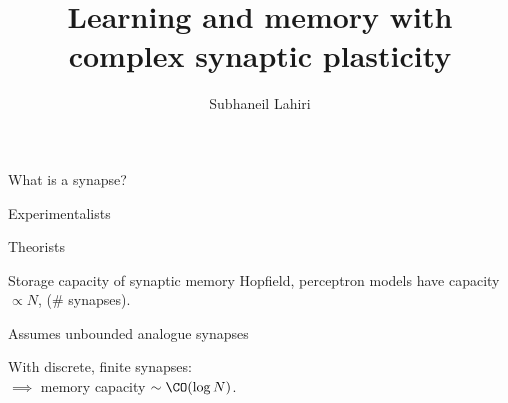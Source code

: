 \documentclass[final]{beamer}%
\title[Complex synaptic plasticity]{Learning and memory with complex synaptic plasticity}
\author{Subhaneil Lahiri%
}
\institute[Stanford]{%
Stanford University, Applied Physics
}
\begin{document}

\begin{frame}
%
 \titlepage
%
\end{frame}


\begin{frame}{What is a synapse?}
%
 \begin{center}
 \parbox[c]{0.45\linewidth}{
  \begin{center}
    Experimentalists
  \end{center}
 }
 \parbox[c]{0.45\linewidth}{
  \begin{center}
    Theorists
  \end{center}
 }

 \parbox[c]{0.45\linewidth}{
 }
 \parbox[c]{0.45\linewidth}{
 }
 \end{center}
%
\end{frame}


\begin{frame}{Storage capacity of synaptic memory}
%
  Hopfield, perceptron models have capacity \alert{$\propto N$}, (\# synapses).

\vp\parbox[t]{0.59\linewidth}{%
  Assumes unbounded analogue synapses

 \vp With discrete, finite synapses:\\
 $\implies$ memory capacity  \alert{$\sim\CO(\log N)$}.
 \\ 
 }
 \parbox[t]{0.4\linewidth}{
    \hfill{}
 }
 \\


%
\end{frame}
\end{document}
